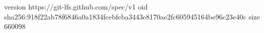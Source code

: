 version https://git-lfs.github.com/spec/v1
oid sha256:918f22ab78f6846a0a1834fcebfeba3443e8170ae2fc605945164be96c23e40c
size 660098
